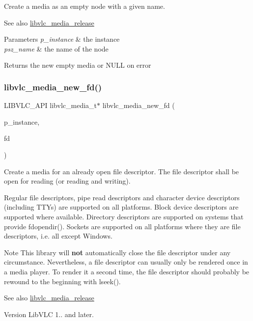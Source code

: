 Create a media as an empty node with a given name.

\begin{DoxySeeAlso}{See also}
\hyperlink{group__libvlc__media_gaffccede262624a361e20c3e887fa9b42}{libvlc\+\_\+media\+\_\+release}
\end{DoxySeeAlso}

\begin{DoxyParams}{Parameters}
{\em p\+\_\+instance} & the instance \\
\hline
{\em psz\+\_\+name} & the name of the node \\
\hline
\end{DoxyParams}
\begin{DoxyReturn}{Returns}
the new empty media or N\+U\+LL on error 
\end{DoxyReturn}
\mbox{\label{group__libvlc__media_ga192451a6b5fef7be482313876a4c3054}} 
\subsubsection{\texorpdfstring{libvlc\+\_\+media\+\_\+new\+\_\+fd()}{libvlc\_media\_new\_fd()}}
{\footnotesize\ttfamily L\+I\+B\+V\+L\+C\+\_\+\+A\+PI libvlc\+\_\+media\+\_\+t$\ast$ libvlc\+\_\+media\+\_\+new\+\_\+fd (\begin{DoxyParamCaption}\item[{\hyperlink{group__libvlc__core_ga316d739a80da4678206c79f4d6c2e284}{libvlc\+\_\+instance\+\_\+t} $\ast$}]{p\+\_\+instance,  }\item[{int}]{fd }\end{DoxyParamCaption})}

Create a media for an already open file descriptor. The file descriptor shall be open for reading (or reading and writing).

Regular file descriptors, pipe read descriptors and character device descriptors (including T\+T\+Ys) are supported on all platforms. Block device descriptors are supported where available. Directory descriptors are supported on systems that provide fdopendir(). Sockets are supported on all platforms where they are file descriptors, i.\+e. all except Windows.

\begin{DoxyNote}{Note}
This library will {\bfseries not} automatically close the file descriptor under any circumstance. Nevertheless, a file descriptor can usually only be rendered once in a media player. To render it a second time, the file descriptor should probably be rewound to the beginning with lseek().
\end{DoxyNote}
\begin{DoxySeeAlso}{See also}
\hyperlink{group__libvlc__media_gaffccede262624a361e20c3e887fa9b42}{libvlc\+\_\+media\+\_\+release}
\end{DoxySeeAlso}
\begin{DoxyVersion}{Version}
Lib\+V\+LC 1.. and later.
\end{DoxyVersion}

